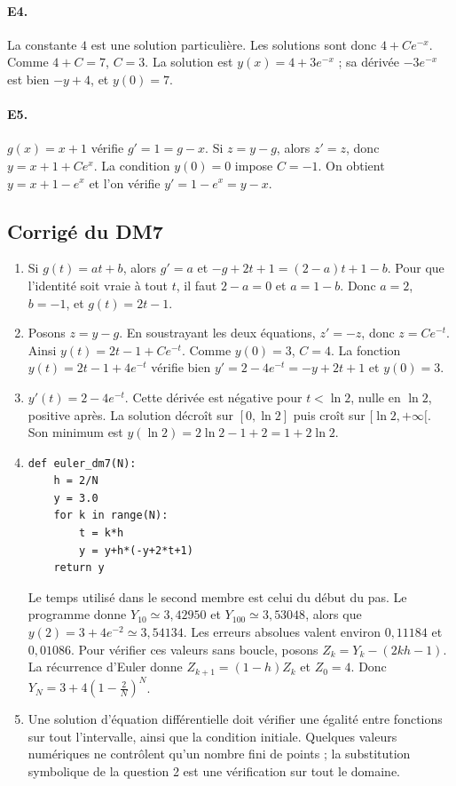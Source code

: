 \paragraph{E4.}La constante $4$ est une solution particulière. Les solutions sont donc $4+Ce^{-x}$. Comme $4+C=7$, $C=3$. La solution est $y(x)=4+3e^{-x}$ ; sa dérivée $-3e^{-x}$ est bien $-y+4$, et $y(0)=7$.

\paragraph{E5.}$g(x)=x+1$ vérifie $g'=1=g-x$. Si $z=y-g$, alors $z'=z$, donc $y=x+1+Ce^x$. La condition $y(0)=0$ impose $C=-1$. On obtient $y=x+1-e^x$ et l'on vérifie $y'=1-e^x=y-x$.

\subsection{Corrigé du DM7}\begin{enumerate}
\item Si $g(t)=at+b$, alors $g'=a$ et $-g+2t+1=(2-a)t+1-b$. Pour que l'identité soit vraie à tout $t$, il faut $2-a=0$ et $a=1-b$. Donc $a=2$, $b=-1$, et $g(t)=2t-1$.
\item Posons $z=y-g$. En soustrayant les deux équations, $z'=-z$, donc $z=Ce^{-t}$. Ainsi $y(t)=2t-1+Ce^{-t}$. Comme $y(0)=3$, $C=4$. La fonction $y(t)=2t-1+4e^{-t}$ vérifie bien $y'=2-4e^{-t}=-y+2t+1$ et $y(0)=3$.
\item $y'(t)=2-4e^{-t}$. Cette dérivée est négative pour $t<\ln2$, nulle en $\ln2$, positive après. La solution décroît sur $[0,\ln2]$ puis croît sur $[\ln2,+\infty[$. Son minimum est $y(\ln2)=2\ln2-1+2=1+2\ln2$.
\item 
\begin{lstlisting}
def euler_dm7(N):
    h = 2/N
    y = 3.0
    for k in range(N):
        t = k*h
        y = y+h*(-y+2*t+1)
    return y
\end{lstlisting}
Le temps utilisé dans le second membre est celui du début du pas. Le programme donne $Y_{10}\simeq3{,}42950$ et $Y_{100}\simeq3{,}53048$, alors que $y(2)=3+4e^{-2}\simeq3{,}54134$. Les erreurs absolues valent environ $0{,}11184$ et $0{,}01086$.
Pour vérifier ces valeurs sans boucle, posons $Z_k=Y_k-(2kh-1)$. La récurrence d'Euler donne $Z_{k+1}=(1-h)Z_k$ et $Z_0=4$. Donc $Y_N=3+4(1-\frac{2}{N})^N$.
\item Une solution d'équation différentielle doit vérifier une égalité entre fonctions sur tout l'intervalle, ainsi que la condition initiale. Quelques valeurs numériques ne contrôlent qu'un nombre fini de points ; la substitution symbolique de la question 2 est une vérification sur tout le domaine.
\end{enumerate}

